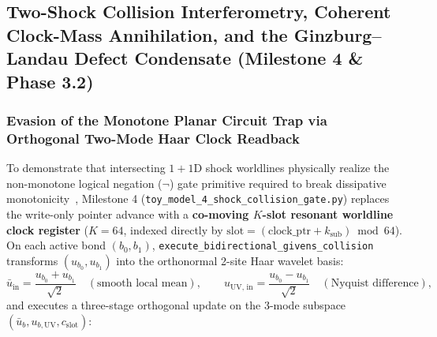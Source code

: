 \documentclass[11pt,a4paper]{article}
\theoremstyle{definition}
\begin{document}
\subsection{Two-Shock Collision Interferometry, Coherent Clock-Mass Annihilation, and the Ginzburg--Landau Defect Condensate (Milestone 4 \& Phase 3.2)}
\label{subsec:milestone4}
\subsubsection{Evasion of the Monotone Planar Circuit Trap via Orthogonal Two-Mode Haar Clock Readback}
To demonstrate that intersecting $1+1\text{D}$ shock worldlines physically realize the non-monotone logical negation ($\neg$) gate primitive required to break dissipative monotonicity~\cite{limaye2009}, Milestone 4 (\texttt{toy\_\allowbreak{}model\_\allowbreak{}4\_\allowbreak{}shock\_\allowbreak{}collision\_\allowbreak{}gate.py}) replaces the write-only pointer advance with a \textbf{co-moving $K$-slot resonant worldline clock register} ($K = 64$, indexed directly by $\text{slot} = (\text{clock\_ptr} + k_{\text{sub}}) \bmod 64$).
On each active bond $(b_0, b_1)$, \texttt{execute\_\allowbreak{}bidirectional\_\allowbreak{}givens\_\allowbreak{}collision} transforms $(u_{b_0}, u_{b_1})$ into the orthonormal 2-site Haar wavelet basis:
\begin{equation}
\bar{u}_{\text{in}} = \frac{u_{b_0} + u_{b_1}}{\sqrt{2}} \quad (\text{smooth local mean}), \qquad u_{\text{UV, in}} = \frac{u_{b_0} - u_{b_1}}{\sqrt{2}} \quad (\text{Nyquist difference}),
\end{equation}
and executes a three-stage orthogonal update on the 3-mode subspace $(\bar{u}_b, u_{b,\text{UV}}, c_{\text{slot}})$:
\end{document}
